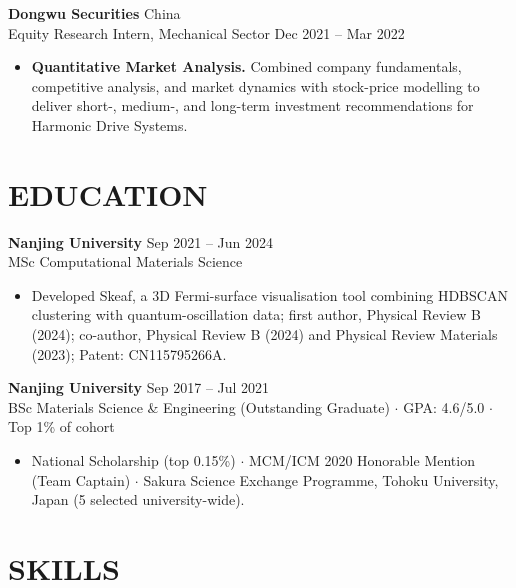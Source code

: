 \documentclass[a4paper,10pt]{article}
\begin{document}
\vspace{2pt}
\noindent\textbf{Dongwu Securities} \hfill China\\
Equity Research Intern, Mechanical Sector \hfill Dec 2021 -- Mar 2022
\begin{itemize}
    \item \textbf{Quantitative Market Analysis.} Combined company fundamentals, competitive analysis, and market dynamics with stock-price modelling to deliver short-, medium-, and long-term investment recommendations for Harmonic Drive Systems.
\end{itemize}

\section{EDUCATION}

\noindent\textbf{Nanjing University} \hfill Sep 2021 -- Jun 2024\\
MSc Computational Materials Science
\begin{itemize}
    \item Developed Skeaf, a 3D Fermi-surface visualisation tool combining HDBSCAN clustering with quantum-oscillation data; first author, Physical Review B (2024); co-author, Physical Review B (2024) and Physical Review Materials (2023); Patent: CN115795266A.
\end{itemize}

\vspace{2pt}
\noindent\textbf{Nanjing University} \hfill Sep 2017 -- Jul 2021\\
BSc Materials Science \& Engineering (Outstanding Graduate) \;$\cdot$\; GPA: 4.6/5.0 \;$\cdot$\; Top 1\% of cohort
\begin{itemize}
    \item National Scholarship (top 0.15\%) \;$\cdot$\; MCM/ICM 2020 Honorable Mention (Team Captain) \;$\cdot$\; Sakura Science Exchange Programme, Tohoku University, Japan (5 selected university-wide).
\end{itemize}

\section{SKILLS}
\end{document}
